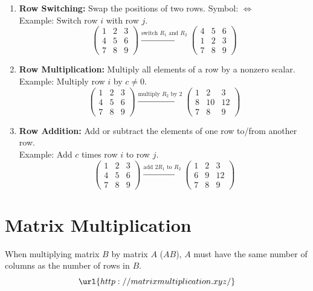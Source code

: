 \documentclass[10pt]{article}
\theoremstyle{plain}
\theoremstyle{definition}
\theoremstyle{remark}
\begin{document}
\begin{enumerate}
    \item \textbf{Row Switching:} Swap the positions of two rows. Symbol: \(\iff\)\\
    Example: Switch row \(i\) with row \(j\).
    \[
    \begin{pmatrix}
    1 & 2 & 3 \\
    4 & 5 & 6 \\
    7 & 8 & 9
    \end{pmatrix}
    \xrightarrow{\text{switch } R_1 \text{ and } R_2}
    \begin{pmatrix}
    4 & 5 & 6 \\
    1 & 2 & 3 \\
    7 & 8 & 9
    \end{pmatrix}
    \]

    \item \textbf{Row Multiplication:} Multiply all elements of a row by a nonzero scalar.\\
    Example: Multiply row \(i\) by \(c \neq 0\).
    \[
    \begin{pmatrix}
    1 & 2 & 3 \\
    4 & 5 & 6 \\
    7 & 8 & 9
    \end{pmatrix}
    \xrightarrow{\text{multiply } R_2 \text{ by } 2}
    \begin{pmatrix}
    1 & 2 & 3 \\
    8 & 10 & 12 \\
    7 & 8 & 9
    \end{pmatrix}
    \]

    \item \textbf{Row Addition:} Add or subtract the elements of one row to/from another row.\\
    Example: Add \(c\) times row \(i\) to row \(j\).
    \[
    \begin{pmatrix}
    1 & 2 & 3 \\
    4 & 5 & 6 \\
    7 & 8 & 9
    \end{pmatrix}
    \xrightarrow{\text{add } 2R_1 \text{ to } R_2}
    \begin{pmatrix}
    1 & 2 & 3 \\
    6 & 9 & 12 \\
    7 & 8 & 9
    \end{pmatrix}
    \]
\end{enumerate}

\section{Matrix Multiplication}

When multiplying matrix \(B\) by matrix \(A\) (\(AB\)), \(A\) must have the same number of columns as the number of rows in \(B\). \\

\[\url{http://matrixmultiplication.xyz/}\]
\end{document}
